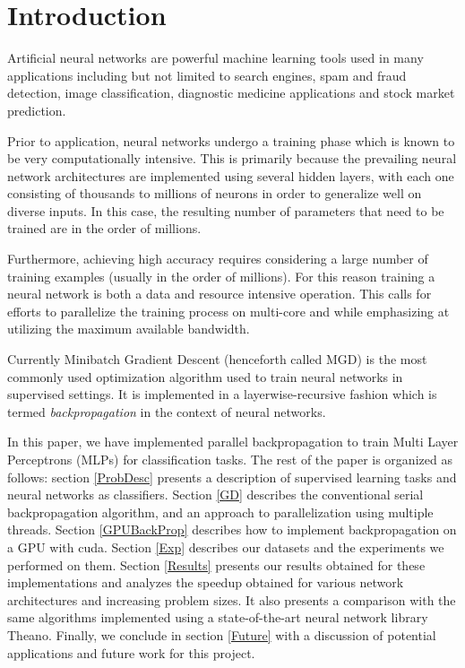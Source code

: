 \section{Introduction}
\label{Intro}

Artificial neural networks are powerful machine learning tools used in many applications including but not limited to search engines, spam and fraud detection, image classification, diagnostic medicine applications and stock market prediction.

Prior to application, neural networks undergo a training phase which is known to be very computationally intensive. This is primarily because the prevailing neural network architectures are implemented using several hidden layers, with each one consisting of thousands to millions of neurons in order to generalize well on diverse inputs. In this case, the resulting number of parameters that need to be trained are in the order of millions.

Furthermore, achieving high accuracy requires considering a large number of training examples (usually in the order of millions). For this reason training a neural network is both a data and resource intensive operation. This calls for efforts to parallelize the training process on multi-core and while emphasizing at utilizing the maximum available bandwidth.

Currently Minibatch Gradient Descent (henceforth called MGD) is the most commonly used optimization algorithm used to train neural networks in supervised settings. It is implemented in a layerwise-recursive fashion which is termed \textit{backpropagation} in the context of neural networks.

In this paper, we have implemented parallel backpropagation to train Multi Layer Perceptrons (MLPs) for classification tasks.
The rest of the paper is organized as follows: section \ref{ProbDesc} presents a description of supervised learning tasks and neural networks as classifiers. Section \ref{GD} describes the conventional serial backpropagation algorithm, and an approach to parallelization using multiple threads. Section \ref{GPUBackProp} describes how to implement backpropagation on a GPU with cuda. Section \ref{Exp} describes our datasets and the experiments we performed on them. Section \ref{Results} presents our results obtained for these implementations and analyzes the speedup obtained for various network architectures and increasing problem sizes. It also presents a comparison with the same algorithms implemented using a state-of-the-art neural network library Theano. Finally, we conclude in section \ref{Future} with a discussion of potential applications and future work for this project.